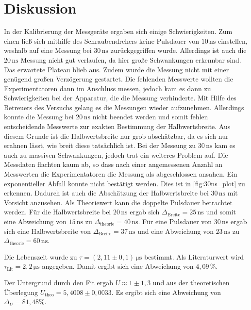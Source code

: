 \section{Diskussion}
\label{sec:Diskussion}

In der Kalibrierung der Messgeräte ergaben sich einige Schwierigkeiten.
Zum einen ließ sich mithilfe des Schraubendrehers keine Pulsdauer von $10 \, \unit{\nano\second}$ einstellen, weshalb auf eine Messung bei $30 \, \unit{\nano\second}$ zurückgegriffen wurde.
Allerdings ist auch die $20 \, \unit{\nano\second}$ Messung nicht gut verlaufen, da hier große Schwankungen erkennbar sind.
Das erwartete Plateau blieb aus.
Zudem wurde die Messung nicht mit einer genügend großen Verzögerung gestartet.
Die fehlenden Messwerte wollten die Experimentatoren dann im Anschluss messen, jedoch kam es dann zu Schwierigkeiten bei der Apparatur, die die Messung verhinderte.
Mit Hilfe des Betreuers des Versuchs gelang es die Messungen wieder aufzunehmen.
Allerdings konnte die Messung bei $20 \, \unit{\nano\second}$ nicht beendet werden und somit fehlen entscheidende Messwerte zur exakten Bestimmung der Halbwertsbreite.
Aus diesem Grunde ist die Halbwertsbreite nur grob abschätzbar, da es sich nur erahnen lässt, wie breit diese tatsächlich ist.
Bei der Messung zu $30 \, \unit{\nano\second}$ kam es auch zu massiven Schwankungen, jedoch trat ein weiteres Problem auf.
Die Messdaten flachten kaum ab, so dass nach einer angemessenen Anzahl an Messwerten die Experimentatoren die Messung als abgeschlossen ansahen.
Ein exponentieller Abfall konnte nicht bestätigt werden.
Dies ist in \autoref{fig:30ns_plot} zu erkennen.
Dadurch ist auch die Abschätzung der Halbwertsbreite bei $30 \, \unit{\nano\second}$ mit Vorsicht anzusehen.
Als Theoriewert kann die doppelte Pulsdauer betrachtet werden.
Für die Halbwertsbreite bei  $20 \, \unit{\nano\second}$ ergab sich $\Delta_\text{Breite} = 25 \, \unit{\nano\second}$ und somit eine Abweichung von $15 \, \unit{\nano\second}$ zu $\Delta_\text{theorie} = 40 \, \unit{\nano\second}$.
Für eine Pulsdauer von $30 \, \unit{\nano\second}$ ergab sich eine Halbwertsbreite von $\Delta_\text{Breite} = 37 \, \unit{\nano\second}$ und eine Abweichung von $23 \, \unit{\nano\second}$ zu $\Delta_\text{theorie} = 60 \, \unit{\nano\second}$.

Die Lebenszeit wurde zu $\tau = (2{,}11\pm 0{,}1) \, \unit{\micro\second}$ bestimmt.
Als Literaturwert wird $\tau_\text{Lit} = 2{,}2 \, \unit{\micro\second}$ angegeben.
Damit ergibt sich eine Abweichung von $4{,}09 \, \% $.

Der Untergrund durch den Fit ergab $U \approx 1 \pm 1{,}3$ und aus der theoretischen Überlegung $U_\text{theo} = 5{,}4008 \pm 0{,}0033$.
Es ergibt sich eine Abweichung von $\Delta_U = 81{,}48 \% $.